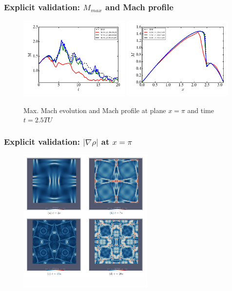 \begin{frame}
	\frametitle{Explicit validation: $M_{max}$ and Mach profile}
	\begin{figure}
		\centering
		\includegraphics[width=0.49\textwidth]{images/MvsT.png}
		\includegraphics[width=0.49\textwidth]{images/M.png}
		\caption{Max. Mach evolution and Mach profile at plane $x = \pi$ and time $t = 2.5TU$}
	\end{figure}
\end{frame}

\begin{frame}
	\frametitle{Explicit validation: $|\nabla \rho|$ at $x = \pi$}
	\begin{figure}
		\centering
		\includegraphics[width=0.6\textwidth]{images/explicitGradRho.pdf}
	\end{figure}
\end{frame}

